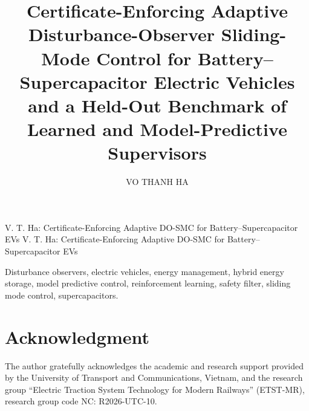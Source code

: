 \documentclass{ieeeaccess}
\begin{document}

\title{Certificate-Enforcing Adaptive Disturbance-Observer Sliding-Mode Control for Battery--Supercapacitor Electric Vehicles and a Held-Out Benchmark of Learned and Model-Predictive Supervisors}

\author{\uppercase{Vo Thanh Ha}}

\address[1]{Faculty of Electrical and Electronic Engineering, University of Transport and Communications, No.~3 Cau Giay, Hanoi, Vietnam}


\markboth
{V. T. Ha: Certificate-Enforcing Adaptive DO-SMC for Battery--Supercapacitor EVs}
{V. T. Ha: Certificate-Enforcing Adaptive DO-SMC for Battery--Supercapacitor EVs}


\begin{abstract}

\end{abstract}

\begin{keywords}
Disturbance observers, electric vehicles, energy management, hybrid energy storage, model predictive control, reinforcement learning, safety filter, sliding mode control, supercapacitors.
\end{keywords}

\titlepgskip=-21pt

\maketitle







\appendices




\section*{Acknowledgment}
The author gratefully acknowledges the academic and research support provided by the University of Transport and Communications, Vietnam, and the research group ``Electric Traction System Technology for Modern Railways'' (ETST-MR), research group code NC: R2026-UTC-10.
\end{document}
